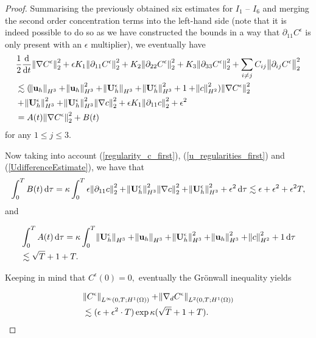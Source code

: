\documentclass[12pt]{report}
\numberwithin{theorem}{chapter}
\numberwithin{corollary}{chapter}
\numberwithin{lemma}{chapter}
\numberwithin{remark}{chapter}
\numberwithin{definition}{chapter}
\numberwithin{prop}{chapter}
\newcommand*\diff{\mathop{}\!\mathrm{d}}
\begin{document}
\begin{proof}
Summarising the previously obtained six estimates for $I_1$ -- $I_6$ and merging the second order concentration terms into the left-hand side (note that it is indeed possible to do so as we have constructed the bounds in a way that $\partial_{11} C^\epsilon$ is only present with an $\epsilon$ multiplier), we eventually have
%
\begin{equation}
  \begin{split}
    & \frac{1}{2} \frac{\diff}{\diff t} \norm{\nabla C^\epsilon}_2^2 + \epsilon K_1 \norm{\partial_{11} C^\epsilon}_2^2 + K_2 \norm{\partial_{22} C^\epsilon}_2^2 + K_3 \norm{\partial_{33} C^\epsilon}_2^2 + \sum_{i \neq j} C_{ij} \norm{\partial_{ij} C^\epsilon}_2^2 \\
    & \lesssim (\norm{\mathbf{u}_h}_{H^3} + \norm{\mathbf{u}_h}_{H^3}^2 + \norm{\mathbf{U}_h^\epsilon}_{H^3} + \norm{\mathbf{U}_h^\epsilon}_{H^3}^2 + 1 + \norm{c}_{H^2}^2) \norm{\nabla C^\epsilon}_2^2 \\
    & + \norm{\mathbf{U}_h^\epsilon}_{H^3}^2 + \norm{\mathbf{U}_h^\epsilon}_{H^3}^2 \norm{\nabla c}_2^2 + \epsilon K_1 \norm{\partial_{11} c}_2^2 + \epsilon^2 \\
    & = A(t)  \norm{\nabla C^\epsilon}_2^2 + B(t) \raisetag{40pt}
  \end{split}
\end{equation}
%
for any $1 \leq j \leq 3.$

Now taking into account (\ref{regularity_c_first}), (\ref{u_regularities_first}) and (\ref{UdifferenceEstimate}), we have that
%
\[ \int_0^T B(t) \diff \tau = \kappa \int_0^T \epsilon \norm{\partial_{11} c}_2^2 + \norm{\mathbf{U}_h^\epsilon}_{H^3}^2 \norm{\nabla c}_2^2 + \norm{\mathbf{U}_h^\epsilon}_{H^3}^2 + \epsilon^2 \diff \tau \lesssim \epsilon + \epsilon^2 + \epsilon^2 T,\]
%
and

\begin{equation}
  \begin{split}
    & \int_0^T A(t) \diff \tau = \kappa \int_0^T \norm{\mathbf{U}_h^\epsilon}_{H^3} + \norm{\mathbf{u}_h}_{H^3} + \norm{\mathbf{U}_h^\epsilon}_{H^3}^2 + \norm{\mathbf{u}_h}_{H^3}^2 + \norm{c}_{H^2}^2 + 1 \diff \tau \\
    & \lesssim \sqrt{T} + 1 + T.
  \end{split}
\end{equation}

Keeping in mind that $C^\epsilon(0) = 0,$ eventually the Gr\"onwall inequality yields

\begin{equation} \label{finalboundforCepsilon}
  \begin{split}
    & \norm{C^\epsilon}_{L^\infty(0,T; H^1(\Omega))} + \norm{\nabla_d C^\epsilon}_{L^2(0,T; H^1(\Omega))} \\
    & \lesssim (\epsilon + \epsilon^2 \cdot T) \exp{\kappa (\sqrt{T} + 1 + T)}.
  \end{split}
\end{equation}


\end{proof}
\end{document}
